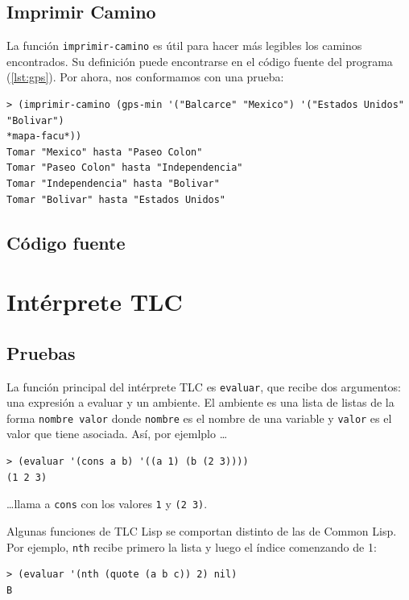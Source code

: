 \documentclass[12pt,titlepage]{article}
\begin{document}
\subsection{Imprimir Camino}

La función \lstinline|imprimir-camino| es útil para hacer más legibles los caminos encontrados. Su definición puede encontrarse en el código fuente del programa (\ref{lst:gps}). Por ahora, nos conformamos con una prueba:
\begin{lstlisting}[basicstyle=\ttfamily\footnotesize]
> (imprimir-camino (gps-min '("Balcarce" "Mexico") '("Estados Unidos" "Bolivar") 
*mapa-facu*))
Tomar "Mexico" hasta "Paseo Colon"
Tomar "Paseo Colon" hasta "Independencia"
Tomar "Independencia" hasta "Bolivar"
Tomar "Bolivar" hasta "Estados Unidos"
\end{lstlisting}

\subsection{Código fuente}



\section{Intérprete TLC}

\subsection{Pruebas}

La función principal del intérprete TLC es \lstinline|evaluar|, que recibe dos argumentos: una expresión a evaluar y un ambiente. El ambiente es una lista de listas de la forma \lstinline|nombre valor| donde \lstinline|nombre| es el nombre de una variable y \lstinline|valor| es el valor que tiene asociada. Así, por ejemlplo \dots
\begin{lstlisting}
> (evaluar '(cons a b) '((a 1) (b (2 3))))
(1 2 3)
\end{lstlisting}
\dots llama a \lstinline|cons| con los valores \lstinline|1| y \lstinline|(2 3)|.

Algunas funciones de TLC Lisp se comportan distinto de las de Common Lisp. Por ejemplo, \lstinline|nth| recibe primero la lista y luego el índice comenzando de 1:
\begin{lstlisting}
> (evaluar '(nth (quote (a b c)) 2) nil)
B
\end{lstlisting}
\end{document}
